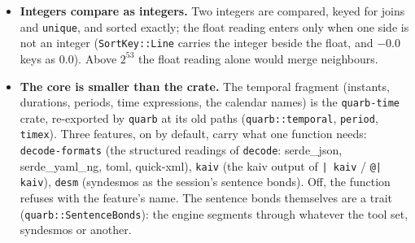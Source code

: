 \documentclass{report}
\begin{document}
\begin{itemize}
\item \textbf{Integers compare as integers.} Two integers are
  compared, keyed for joins and \texttt{unique}, and sorted
  exactly; the float reading enters only when one side is not
  an integer (\texttt{SortKey::Line} carries the integer beside
  the float, and $-0.0$ keys as $0.0$). Above $2^{53}$ the float
  reading alone would merge neighbours.

\item \textbf{The core is smaller than the crate.} The temporal
  fragment (instants, durations, periods, time expressions, the
  calendar names) is the \texttt{quarb-time} crate, re-exported by
  \texttt{quarb} at its old paths (\texttt{quarb::temporal},
  \texttt{period}, \texttt{timex}). Three features, on by
  default, carry what one function needs: \texttt{decode-formats}
  (the structured readings of \texttt{decode}: serde\_json,
  serde\_yaml\_ng, toml, quick-xml), \texttt{kaiv} (the kaiv
  output of \texttt{| kaiv} / \texttt{@| kaiv}), \texttt{desm}
  (syndesmos as the session's sentence bonds). Off, the function
  refuses with the feature's name. The sentence bonds themselves
  are a trait (\texttt{quarb::SentenceBonds}): the engine segments
  through whatever the tool set, syndesmos or another.


\end{itemize}
\end{document}
